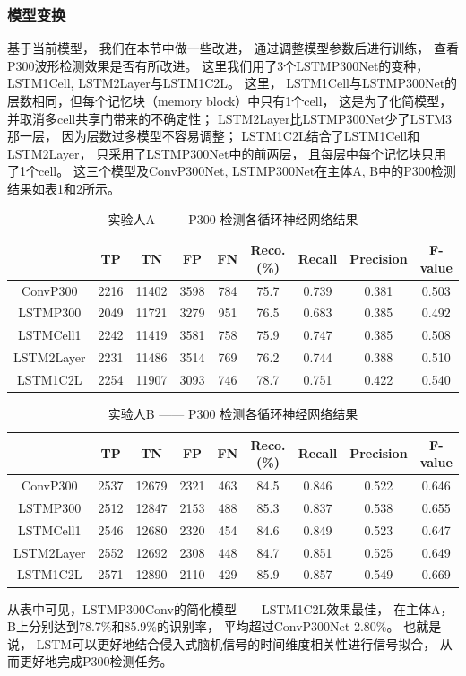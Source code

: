 \subsubsection{模型变换}

基于当前模型， 我们在本节中做一些改进， 通过调整模型参数后进行训练， 查看P300波形检测效果是否有所改进。 这里我们用了3个LSTMP300Net的变种， LSTM1Cell, LSTM2Layer与LSTM1C2L。 这里，  LSTM1Cell与LSTMP300Net的层数相同，但每个记忆块（memory block）中只有1个cell， 这是为了化简模型， 并取消多cell共享门带来的不确定性； LSTM2Layer比LSTMP300Net少了LSTM3那一层， 因为层数过多模型不容易调整； LSTM1C2L结合了LSTM1Cell和LSTM2Layer， 只采用了LSTMP300Net中的前两层， 且每层中每个记忆块只用了1个cell。 这三个模型及ConvP300Net, LSTMP300Net在主体A, B中的P300检测结果如表\ref{tab:LSTM_multi_A}和\ref{tab:LSTM_multi_B}所示。

\begin{table}[ht]
\centering
  \caption{实验人A —— P300 检测各循环神经网络结果}
  \begin{tabular}{|c||c|c|c|c|c|c|c|c|}
  \hline
   & TP & TN & FP & FN & Reco.(\%) & Recall & Precision & F-value \\
  \hline\hline
	ConvP300 & 2216 & 11402 & 3598 & 784 & 75.7  & 0.739  & 0.381  & 0.503 \\
	\hline
	LSTMP300 & 2049&	11721&	3279&	951&	76.5& 	0.683& 	0.385& 	0.492  \\
	\hline
	LSTMCell1 & 2242 & 11419 & 3581 &	758&	75.9 & 0.747 &	0.385& 0.508\\
	\hline
	LSTM2Layer & 2231	&11486&	3514&	769&	76.2& 	0.744& 	0.388& 	0.510 \\
	\hline
	LSTM1C2L & 2254&	11907&	3093&	746&	78.7& 	0.751& 	0.422& 	0.540  \\
	\hline
  \end{tabular}
  \centering \label{tab:LSTM_multi_A}
\end{table}


\begin{table}[ht]
\centering
  \caption{实验人B —— P300 检测各循环神经网络结果}
  \begin{tabular}{|c||c|c|c|c|c|c|c|c|}
  \hline
   & TP & TN & FP & FN & Reco.(\%) & Recall & Precision & F-value \\
  \hline\hline
  	ConvP300 & 2537 & 12679 & 2321 & 463 & 84.5 & 0.846 & 0.522 & 0.646 \\
	\hline
	LSTMP300 & 2512	&12847	&2153	&488	&85.3 &	0.837 &	0.538 &	0.655   \\
	\hline
	LSTMCell1 & 2546&	12680	&2320	&454	&84.6 &	0.849 &	0.523 &	0.647 \\
	\hline
	LSTM2Layer & 2552&	12692&	2308&448	&84.7 &	0.851 	&0.525& 	0.649  \\
	\hline
	LSTM1C2L & 2571	&12890&	2110&	429	&85.9 &	0.857 &	0.549 &	0.669 \\
  \hline
  \end{tabular}
  \centering \label{tab:LSTM_multi_B}
\end{table}


从表中可见，LSTMP300Conv的简化模型——LSTM1C2L效果最佳， 在主体A，B上分别达到78.7\%和85.9\%的识别率， 平均超过ConvP300Net 2.80\%。 也就是说， LSTM可以更好地结合侵入式脑机信号的时间维度相关性进行信号拟合， 从而更好地完成P300检测任务。